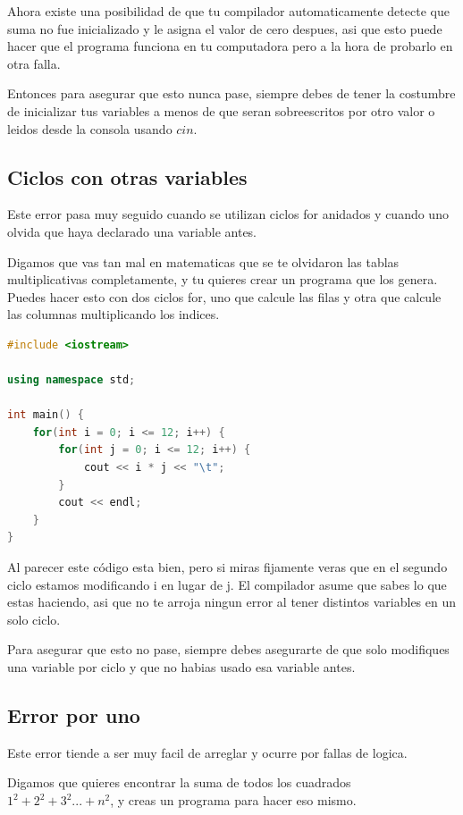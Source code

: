 \documentclass{article}
\begin{document}
Ahora existe una posibilidad de que tu compilador automaticamente detecte que suma no fue inicializado y le asigna el valor de cero despues, asi que esto puede hacer que el programa funciona en tu computadora pero a la hora de probarlo en otra falla.

Entonces para asegurar que esto nunca pase, siempre debes de tener la costumbre de inicializar tus variables a menos de que seran sobreescritos por otro valor o leidos desde la consola usando $cin$.

\subsection{Ciclos con otras variables}
Este error pasa muy seguido cuando se utilizan ciclos for anidados y cuando uno olvida que haya declarado una variable antes.

Digamos que vas tan mal en matematicas que se te olvidaron las tablas multiplicativas completamente, y tu quieres crear un programa que los genera. Puedes hacer esto con dos ciclos for, uno que calcule las filas y otra que calcule las columnas multiplicando los indices.

\begin{lstlisting}[language=C++, caption=Ciclos con otras variables]
#include <iostream>

using namespace std;

int main() {
    for(int i = 0; i <= 12; i++) {
        for(int j = 0; i <= 12; i++) {
            cout << i * j << "\t";
        }
        cout << endl;
    }
}
\end{lstlisting}

Al parecer este código esta bien, pero si miras fijamente veras que en el segundo ciclo estamos modificando i en lugar de j. El compilador asume que sabes lo que estas haciendo, asi que no te arroja ningun error al tener distintos variables en un solo ciclo.

Para asegurar que esto no pase, siempre debes asegurarte de que solo modifiques una variable por ciclo y que no habias usado esa variable antes.

\subsection{Error por uno}
Este error tiende a ser muy facil de arreglar y ocurre por fallas de logica.

Digamos que quieres encontrar la suma de todos los cuadrados $1^2 + 2^2 + 3^2 ... + n^2$, y creas un programa para hacer eso mismo.
\end{document}
